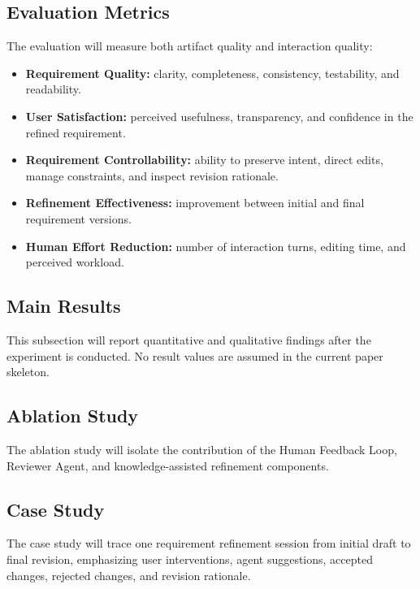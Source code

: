 \subsection{Evaluation Metrics}
\label{subsec:exp-metrics}
The evaluation will measure both artifact quality and interaction quality:
\begin{itemize}[leftmargin=*]
  \item \textbf{Requirement Quality:} clarity, completeness, consistency, testability, and readability.
  \item \textbf{User Satisfaction:} perceived usefulness, transparency, and confidence in the refined requirement.
  \item \textbf{Requirement Controllability:} ability to preserve intent, direct edits, manage constraints, and inspect revision rationale.
  \item \textbf{Refinement Effectiveness:} improvement between initial and final requirement versions.
  \item \textbf{Human Effort Reduction:} number of interaction turns, editing time, and perceived workload.
\end{itemize}

\subsection{Main Results}
\label{subsec:exp-results}
This subsection will report quantitative and qualitative findings after the experiment is conducted. No result values are assumed in the current paper skeleton.

\subsection{Ablation Study}
\label{subsec:exp-ablation}
The ablation study will isolate the contribution of the Human Feedback Loop, Reviewer Agent, and knowledge-assisted refinement components.

\subsection{Case Study}
\label{subsec:exp-case-study}
The case study will trace one requirement refinement session from initial draft to final revision, emphasizing user interventions, agent suggestions, accepted changes, rejected changes, and revision rationale.
